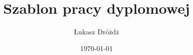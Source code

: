 \documentclass[a4paper, 12pt, polish]{thesis} %
\title{Szablon pracy dyplomowej}         %
\author{Łukasz Dróżdż}                   %
\date{\today}                            %
\begin{document}
\maketitle                               %
\preface                                 %
\body                                    %
\appendix                                %
\end{document}

